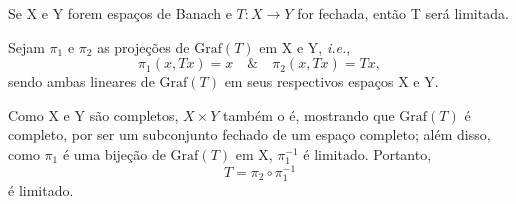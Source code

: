 \documentclass[../functional_analysis.tex]{subfiles}
\begin{document}
\hypertarget{closed_graphic}{
	\begin{theorem*}
		Se X e Y forem espaços de Banach e \(T:X\rightarrow Y\) for fechada, então T será limitada.
	\end{theorem*}
}
\begin{proof*}
	Sejam \(\pi_1\) e \(\pi_2\) as projeções de \(\mathrm{Graf}(T)\) em X e Y, \textit{i.e.},
	\[
		\pi_1(x, Tx) = x \quad\&\quad \pi_2(x, Tx) = Tx,
	\]
	sendo ambas lineares de \(\mathrm{Graf}(T)\) em seus respectivos espaços X e Y.

	Como X e Y são completos, \(X\times Y\) também o é, mostrando que \(\mathrm{Graf}(T)\) é completo, por ser um subconjunto fechado de um espaço completo; além disso, como \(\pi_1\) é uma bijeção de \(\mathrm{Graf}(T)\) em X, \(\pi_{1}^{-1}\) é limitado. Portanto,
	\[
		T = \pi_2 \circ \pi_{1}^{-1}
	\]
	é limitado. \qedsymbol
\end{proof*}
\end{document}
